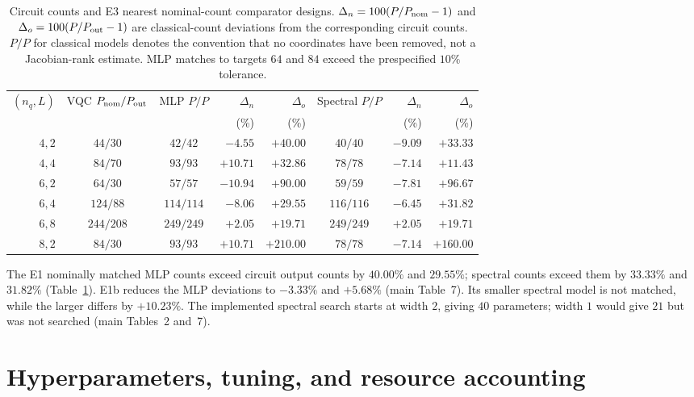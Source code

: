 \documentclass[11pt]{article}
\begin{document}
\begin{table}[htbp]
\centering\scriptsize
\caption{Circuit counts and E3 nearest nominal-count comparator designs.
$\Delta_n=100(P/P_{\rm nom}-1)$ and $\Delta_o=100(P/P_{\rm out}-1)$
are classical-count deviations from the corresponding circuit counts.
$P/P$ for classical models denotes the convention that no coordinates
have been removed, not a Jacobian-rank estimate. MLP matches to targets
$64$ and $84$ exceed the prespecified $10\%$ tolerance.}
\label{tab:extended-counts}
\begin{tabular}{rccrrcrr}
\toprule
$(n_q,L)$ & VQC $P_{\rm nom}/P_{\rm out}$ & MLP $P/P$ & $\Delta_n$ & $\Delta_o$ & Spectral $P/P$ & $\Delta_n$ & $\Delta_o$ \\
 & & & (\%) & (\%) & & (\%) & (\%) \\
\midrule
$4,2$ & $44/30$ & $42/42$ & $-4.55$ & $+40.00$ & $40/40$ & $-9.09$ & $+33.33$ \\
$4,4$ & $84/70$ & $93/93$ & $+10.71$ & $+32.86$ & $78/78$ & $-7.14$ & $+11.43$ \\
$6,2$ & $64/30$ & $57/57$ & $-10.94$ & $+90.00$ & $59/59$ & $-7.81$ & $+96.67$ \\
$6,4$ & $124/88$ & $114/114$ & $-8.06$ & $+29.55$ & $116/116$ & $-6.45$ & $+31.82$ \\
$6,8$ & $244/208$ & $249/249$ & $+2.05$ & $+19.71$ & $249/249$ & $+2.05$ & $+19.71$ \\
$8,2$ & $84/30$ & $93/93$ & $+10.71$ & $+210.00$ & $78/78$ & $-7.14$ & $+160.00$ \\
\bottomrule
\end{tabular}
\end{table}

The E1 nominally matched MLP counts exceed circuit output counts by
$40.00\%$ and $29.55\%$; spectral counts exceed them by $33.33\%$ and
$31.82\%$ (Table~\ref{tab:extended-counts}). E1b reduces the MLP deviations
to $-3.33\%$ and $+5.68\%$ (main Table~7). Its smaller spectral model
is not matched, while the larger differs by $+10.23\%$. The implemented
spectral search starts at width $2$, giving $40$ parameters; width $1$
would give $21$ but was not searched (main Tables~2 and~7).

\FloatBarrier
\section{Hyperparameters, tuning, and resource accounting}
\end{document}
